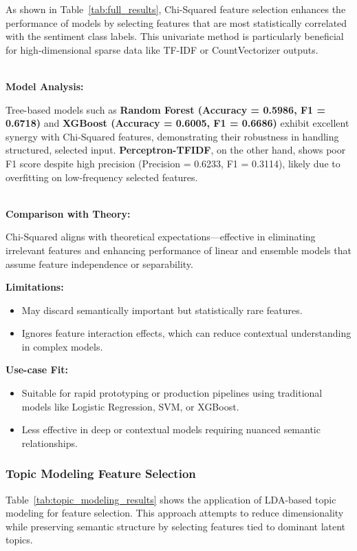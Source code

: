 As shown in Table~\ref{tab:full_results}, Chi-Squared feature selection enhances the performance of models by selecting features that are most statistically correlated with the sentiment class labels. This univariate method is particularly beneficial for high-dimensional sparse data like TF-IDF or CountVectorizer outputs.

${}$\\
\textbf{Model Analysis:} 

Tree-based models such as \textbf{Random Forest (Accuracy = 0.5986, F1 = 0.6718)} and \textbf{XGBoost (Accuracy = 0.6005, F1 = 0.6686)} exhibit excellent synergy with Chi-Squared features, demonstrating their robustness in handling structured, selected input. \textbf{Perceptron-TFIDF}, on the other hand, shows poor F1 score despite high precision (Precision = 0.6233, F1 = 0.3114), likely due to overfitting on low-frequency selected features.

${}$\\
\textbf{Comparison with Theory:} 

Chi-Squared aligns with theoretical expectations—effective in eliminating irrelevant features and enhancing performance of linear and ensemble models that assume feature independence or separability.

\textbf{Limitations:}

\begin{itemize}
    \item May discard semantically important but statistically rare features.
    \item Ignores feature interaction effects, which can reduce contextual understanding in complex models.
\end{itemize}

\textbf{Use-case Fit:}

\begin{itemize}
    \item Suitable for rapid prototyping or production pipelines using traditional models like Logistic Regression, SVM, or XGBoost.
    \item Less effective in deep or contextual models requiring nuanced semantic relationships.
\end{itemize}

\subsubsection{Topic Modeling Feature Selection}

Table~\ref{tab:topic_modeling_results} shows the application of LDA-based topic modeling for feature selection. This approach attempts to reduce dimensionality while preserving semantic structure by selecting features tied to dominant latent topics.

